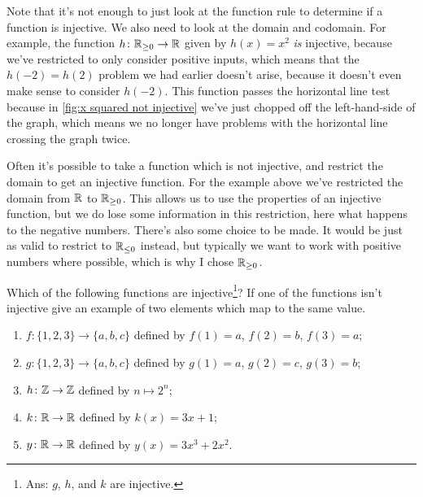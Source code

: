 \documentclass[fleqn]{LectureClass/LectureClass}
\begin{document}
    Note that it's not enough to just look at the function rule to determine if a function is injective.
    We also need to look at the domain and codomain.
    For example, the function \(h \colon \mathbb{R}_{\ge0} \to \mathbb{R}\) given by \(h(x) = x^2\) \emph{is} injective, because we've restricted to only consider positive inputs, which means that the \(h(-2) = h(2)\) problem we had earlier doesn't arise, because it doesn't even make sense to consider \(h(-2)\).
    This function passes the horizontal line test because in \cref{fig:x squared not injective} we've just chopped off the left-hand-side of the graph, which means we no longer have problems with the horizontal line crossing the graph twice.
    
    Often it's possible to take a function which is not injective, and restrict the domain to get an injective function.
    For the example above we've restricted the domain from \(\mathbb{R}\) to \(\mathbb{R}_{\ge 0}\).
    This allows us to use the properties of an injective function, but we do lose some information in this restriction, here what happens to the negative numbers.
    There's also some choice to be made.
    It would be just as valid to restrict to \(\mathbb{R}_{\le 0}\) instead, but typically we want to work with positive numbers where possible, which is why I chose \(\mathbb{R}_{\ge 0}\).
        
    \begin{problem}{}{}
        Which of the following functions are injective\footnote{Ans: \(g\), \(h\), and \(k\) are injective.}?
        If one of the functions isn't injective give an example of two elements which map to the same value.
        \begin{enumerate}
            \item \(f \colon \{1, 2, 3\} \to \{a, b, c\}\) defined by \(f(1) = a\), \(f(2) = b\), \(f(3) = a\);
            \item \(g \colon \{1, 2, 3\} \to \{a, b, c\}\) defined by \(g(1) = a\), \(g(2) = c\), \(g(3) = b\);
            \item \(h \colon \mathbb{Z} \to \mathbb{Z}\) defined by \(n \mapsto 2^n\);
            \item \(k \colon \mathbb{R} \to \mathbb{R}\) defined by \(k(x) = 3x + 1\);
            \item \(y \colon \mathbb{R} \to \mathbb{R}\) defined by \(y(x) = 3x^3 + 2x^2\).
        \end{enumerate}
    \end{problem}
    
\end{document}
